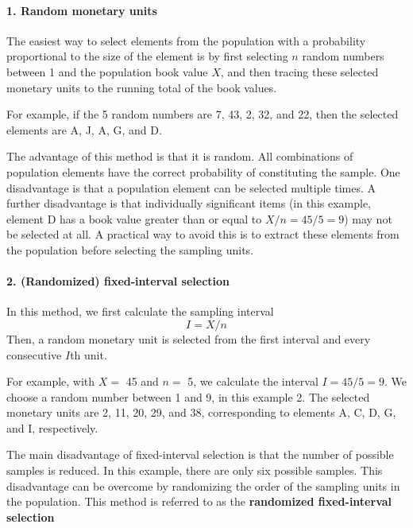 \paragraph{1. Random monetary units} \label{par:random_monetary_units}The easiest way to select elements from the population with a probability proportional to the size of the element is by first selecting $n$ random numbers between 1 and the population book value $X$, and then tracing these selected monetary units to the running total of the book values.  

For example, if the 5 random numbers are 7, 43, 2, 32, and 22, then the selected elements are A, J, A, G, and D. 

The advantage of this method is that it is random. All combinations of population elements have the correct probability of constituting the sample. One disadvantage is that a population element can be selected multiple times. A further disadvantage is that individually significant items (in this example, element D has a book value greater than or equal to $X/n = 45/5 = 9$) may not be selected at all. A practical way to avoid this is to extract these elements from the population before selecting the sampling units.

\paragraph{2. (Randomized) fixed-interval selection}\label{par:fixed_interval_selection} In this method, we first calculate the sampling interval 
\begin{equation}
I = X / n
\label{eq:sampling_interval}
\end{equation}
Then, a random monetary unit is selected from the first interval and every consecutive $I$th unit.

For example, with $X =$ 45 and $n =$ 5, we calculate the interval $I = 45/5 =9$. We choose a random number between 1 and 9, in this example 2. The selected monetary units are 2, 11, 20, 29, and 38, corresponding to elements A, C, D, G, and I, respectively.

The main disadvantage of fixed-interval selection is that the number of possible samples is reduced. In this example, there are only six possible samples. This disadvantage can be overcome by randomizing the order of the sampling units in the population. This method is referred to as the \textbf{randomized fixed-interval selection} 

